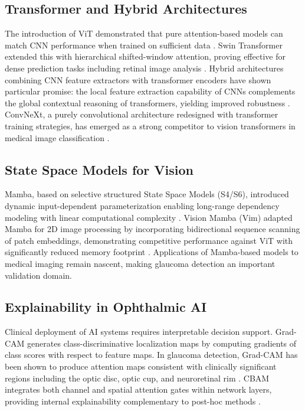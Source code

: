 \documentclass[conference]{IEEEtran}
\begin{document}
\subsection{Transformer and Hybrid Architectures}

The introduction of ViT demonstrated that pure 
attention-based models can match CNN performance when 
trained on sufficient data \cite{b4}. Swin Transformer 
extended this with hierarchical shifted-window attention, 
proving effective for dense prediction tasks including 
retinal image analysis \cite{b11}. Hybrid architectures 
combining CNN feature extractors with transformer 
encoders have shown particular promise: the local feature 
extraction capability of CNNs complements the global 
contextual reasoning of transformers, yielding improved 
robustness \cite{b6}. ConvNeXt, a purely convolutional 
architecture redesigned with transformer training 
strategies, has emerged as a strong competitor to 
vision transformers in medical image classification \cite{b12}.

\subsection{State Space Models for Vision}

Mamba, based on selective structured State Space Models 
(S4/S6), introduced dynamic input-dependent parameterization 
enabling long-range dependency modeling with linear 
computational complexity \cite{b5}. Vision Mamba (Vim) 
adapted Mamba for 2D image processing by incorporating 
bidirectional sequence scanning of patch embeddings, 
demonstrating competitive performance against ViT 
with significantly reduced memory footprint \cite{b13}. 
Applications of Mamba-based models to medical imaging 
remain nascent, making glaucoma detection an important 
validation domain.

\subsection{Explainability in Ophthalmic AI}

Clinical deployment of AI systems requires interpretable 
decision support. Grad-CAM \cite{b7} generates class-discriminative 
localization maps by computing gradients of class scores 
with respect to feature maps. In glaucoma detection, 
Grad-CAM has been shown to produce attention maps 
consistent with clinically significant regions including 
the optic disc, optic cup, and neuroretinal rim \cite{b14}. 
CBAM integrates both channel and spatial attention 
gates within network layers, providing internal 
explainability complementary to post-hoc methods \cite{b15}.
\end{document}
